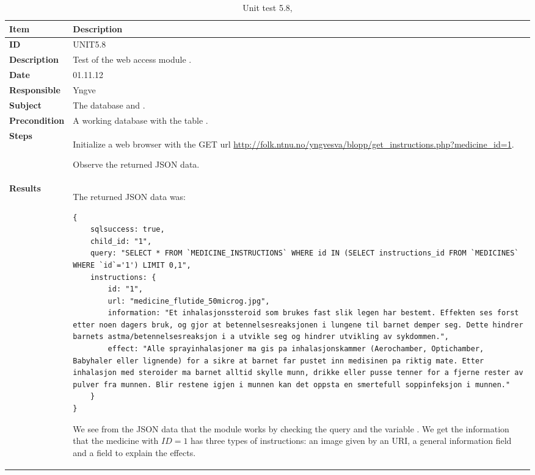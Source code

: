 \begin{table} %
	\begin{center}
		\begin{tabular}{|p{3.0cm}|p{14.0cm}|}
			\hline
			\bf{Item} & \bf{Description}\\
			\hline
			\bf{ID} & UNIT5.8\\
			\bf{Description} & Test of the web access module \code{get\_instructions.php}.\\
			\bf{Date} & 01.11.12\\
			\bf{Responsible} & Yngve\\
			\bf{Subject} & The database and \code{get\_instructions.php}.\\
			\bf{Precondition} & A working database with the table \code{MEDICINE\_INSTRUCTIONS}.\\
			\bf{Steps} &
			\begin{tabulenum}
				\item Initialize a web browser with the GET url \url{http://folk.ntnu.no/yngvesva/blopp/get\_instructions.php?medicine\_id=1}.
				\item Observe the returned JSON data.
			\end{tabulenum}\\
			\hline
			\bf{Results} & The returned JSON data was: 
\begin{lstlisting}[caption=Returned JSON from \code{get\_instructions.php}]
{
	sqlsuccess: true,
	child_id: "1",
	query: "SELECT * FROM `MEDICINE_INSTRUCTIONS` WHERE id IN (SELECT instructions_id FROM `MEDICINES` WHERE `id`='1') LIMIT 0,1",
	instructions: {
		id: "1",
		url: "medicine_flutide_50microg.jpg",
		information: "Et inhalasjonssteroid som brukes fast slik legen har bestemt. Effekten ses forst etter noen dagers bruk, og gjor at betennelsesreaksjonen i lungene til barnet demper seg. Dette hindrer barnets astma/betennelsesreaksjon i a utvikle seg og hindrer utvikling av sykdommen.",
		effect: "Alle sprayinhalasjoner ma gis pa inhalasjonskammer (Aerochamber, Optichamber, Babyhaler eller lignende) for a sikre at barnet far pustet inn medisinen pa riktig mate. Etter inhalasjon med steroider ma barnet alltid skylle munn, drikke eller pusse tenner for a fjerne rester av pulver fra munnen. Blir restene igjen i munnen kan det oppsta en smertefull soppinfeksjon i munnen."
	}
}
\end{lstlisting}
			We see from the JSON data that the module works by checking the query 
			and the variable \code{sqlsuccess}. We get the information that the medicine 
			with $ID=1$ has three types of instructions: an image given by an URI, 
			a general information field and a field to explain the effects.\\
			\hline
		\end{tabular}
	\end{center}
	\caption{Unit test 5.8, }
	\label{tab:unit5.8}
\end{table}

